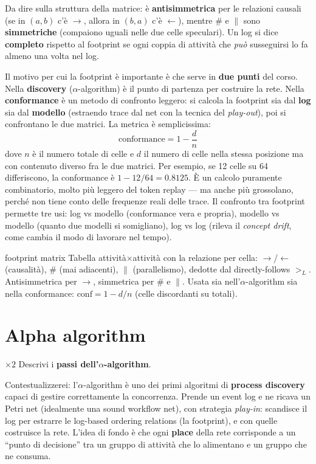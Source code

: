 Da dire sulla struttura della matrice: è \textbf{antisimmetrica} per le relazioni causali (se in $(a,b)$ c'è $\to$, allora in $(b,a)$ c'è $\leftarrow$), mentre $\#$ e $\parallel$ sono \textbf{simmetriche} (compaiono uguali nelle due celle speculari). Un log si dice \textbf{completo} rispetto al footprint se ogni coppia di attività che \emph{può} susseguirsi lo fa almeno una volta nel log.

Il motivo per cui la footprint è importante è che serve in \textbf{due punti} del corso. Nella \textbf{discovery} ($\alpha$-algorithm) è il punto di partenza per costruire la rete. Nella \textbf{conformance} è un metodo di confronto leggero: si calcola la footprint sia dal \textbf{log} sia dal \textbf{modello} (estraendo trace dal net con la tecnica del \emph{play-out}), poi si confrontano le due matrici. La metrica è semplicissima:
$$\text{conformance} = 1 - \frac{d}{n}$$
dove $n$ è il numero totale di celle e $d$ il numero di celle nella stessa posizione ma con contenuto diverso fra le due matrici. Per esempio, se 12 celle su 64 differiscono, la conformance è $1 - 12/64 = 0.8125$. È un calcolo puramente combinatorio, molto più leggero del token replay — ma anche più grossolano, perché non tiene conto delle frequenze reali delle trace. Il confronto tra footprint permette tre usi: log vs modello (conformance vera e propria), modello vs modello (quanto due modelli si somigliano), log vs log (rileva il \emph{concept drift}, come cambia il modo di lavorare nel tempo).

\begin{puntochiave}{footprint matrix}
Tabella attività$\times$attività con la relazione per cella: $\to$/$\leftarrow$ (causalità), $\#$ (mai adiacenti), $\parallel$ (parallelismo), dedotte dal directly-follows $>_L$. Antisimmetrica per $\to$, simmetrica per $\#$ e $\parallel$. Usata sia nell'$\alpha$-algorithm sia nella conformance: $\text{conf}=1-d/n$ (celle discordanti su totali).
\end{puntochiave}

\section{Alpha algorithm}

\begin{domanda}{$\times 2$}
Descrivi i \textbf{passi dell'$\alpha$-algorithm}.
\end{domanda}

Contestualizzerei: l'$\alpha$-algorithm è uno dei primi algoritmi di \textbf{process discovery} capaci di gestire correttamente la concorrenza. Prende un event log e ne ricava un Petri net (idealmente una sound workflow net), con strategia \emph{play-in}: scandisce il log per estrarre le log-based ordering relations (la footprint), e con quelle costruisce la rete. L'idea di fondo è che ogni \textbf{place} della rete corrisponde a un ``punto di decisione'' tra un gruppo di attività che lo alimentano e un gruppo che ne consuma.

